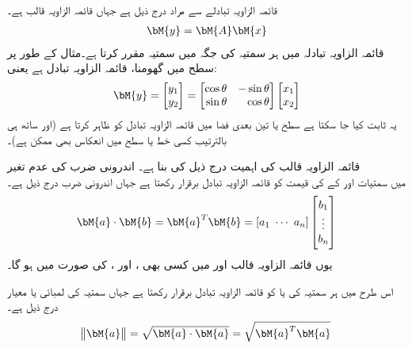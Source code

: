قائمہ الزاویہ تبادلے سے مراد درج ذیل ہے جہاں  قائمہ الزاویہ قالب ہے۔
\begin{align}
\bM{y}=\bM{A}\bM{x}
\end{align}
 قائمہ الزاویہ تبادلہ  میں ہر سمتیہ  کی جگہ  میں سمتیہ  مقرر کرتا ہے۔مثال کے طور پر سطح میں گھومنا، قائمہ الزاویہ تبادل ہے یعنی:
\begin{align}\label{مساوات_امتیازی_سطحی_گردش}
\bM{y}=\begin{bmatrix} y_1\\y_2 \end{bmatrix}=\begin{bmatrix*}[r] \cos \theta&-\sin \theta\\ \sin \theta &\cos \theta \end{bmatrix*}\begin{bmatrix}x_1\\x_2  \end{bmatrix}
\end{align}
یہ ثابت کیا جا سکتا ہے سطح یا تین بعدی فضا میں قائمہ الزاویہ تبادل  کو ظاہر کرتا ہے (اور ساتھ ہی بالترتیب کسی خط یا سطح میں انعکاس بھی ممکن ہے)۔

قائمہ الزاویہ قالب کی اہمیت درج ذیل کی بنا ہے۔
\quad اندرونی ضرب کی عدم تغیر\\
 میں سمتیات  اور  کے  کی قیمت کو قائمہ الزاویہ تبادل  برقرار رکھتا ہے جہاں اندرونی ضرب درج ذیل ہے۔
\begin{align}
\bM{a}\cdot \bM{b}=\bM{a}^T\bM{b}=[a_1\,\,\cdots\,\,a_n]\begin{bmatrix}b_1\\  \vdots \\ b_n  \end{bmatrix}
\end{align}
یوں  قائمہ الزاویہ قالب  اور  میں کسی بھی  ،  اور ،  کی صورت میں  ہو گا۔

اس طرح   میں ہر سمتیہ  کی  یا  کو قائمہ الزاویہ تبادل برقرار رکھتا ہے جہاں سمتیہ کی لمبائی یا معیار درج ذیل ہے۔
\begin{align}
\norm{\bM{a}}=\sqrt{\bM{a}\cdot \bM{a}}=\sqrt{\bM{a}^T\bM{a}}
\end{align}  

